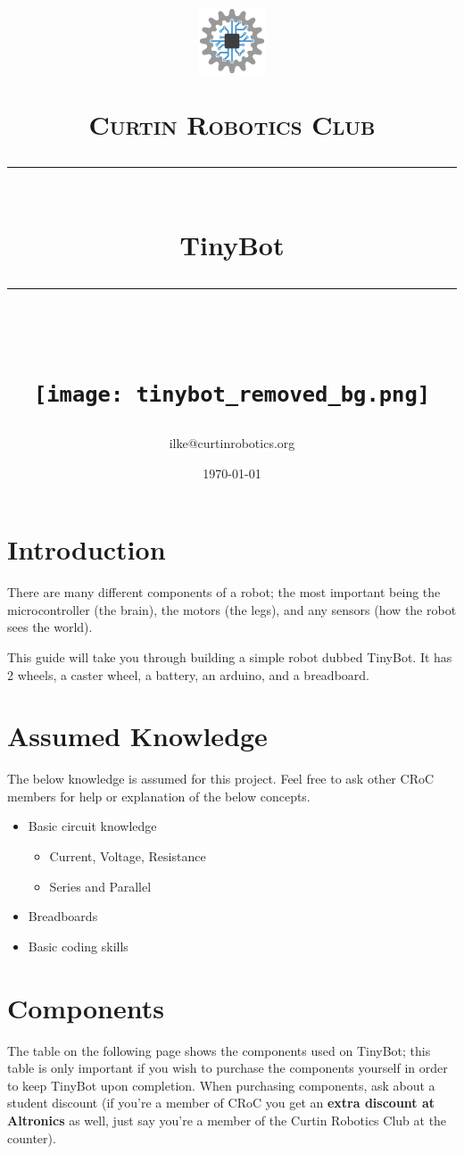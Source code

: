 \documentclass[a4paper,12pt]{article}
\title{	
    \begin{center}
        \includegraphics[width=0.15\textwidth]{CRoCLogo(mediumquality).png}
    \end{center}
	\normalfont\normalsize
	\textsc{Curtin Robotics Club}\\ %
	\vspace{25pt} %
	\rule{\linewidth}{0.5pt}\\ %
	\vspace{20pt} %
    {\huge TinyBot }\\
	\vspace{12pt} %
	\rule{\linewidth}{2pt}\\ %
	\vspace{12pt} %
  \begin{center}
    \texttt{[image: tinybot\_removed\_bg.png]}
  \end{center}
}
\author{\small ilke@curtinrobotics.org} %
\date{\normalsize\today} %
\begin{document}
\maketitle

\pagebreak
{}
\tableofcontents

\pagebreak
{}

\section{Introduction}

There are many different components of a robot; the most important being the microcontroller (the brain), the motors (the legs), and any sensors (how the robot sees the world).

This guide will take you through building a simple robot dubbed TinyBot. It has 2 wheels, a caster wheel, a battery, an arduino, and a breadboard.

\section{Assumed Knowledge}

The below knowledge is assumed for this project. Feel free to ask other CRoC members for help or explanation of the below concepts.


\begin{itemize}
    \item Basic circuit knowledge
    \begin{itemize}
        \item Current, Voltage, Resistance
        \item Series and Parallel
    \end{itemize}
    \item Breadboards
    \item Basic coding skills
\end{itemize}

\section{Components}\label{sec:components}
 
The table on the following page shows the components used on TinyBot; this table is only important if you wish to purchase the components yourself in order to keep TinyBot upon completion. When purchasing components, ask about a student discount (if you're a member of CRoC you get an \textbf{extra discount at Altronics} as well, just say you're a member of the Curtin Robotics Club at the counter). \\
\end{document}
